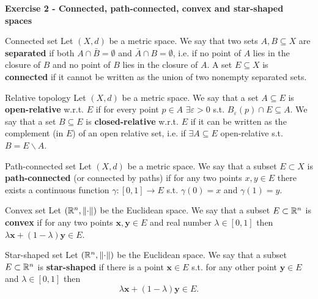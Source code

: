\documentclass[12pt,a4paper]{article}
\begin{document}
\noindent\textbf{Exercise 2 - Connected, path-connected, convex and star-shaped spaces}\\



\begin{Definition}{Connected set}{}
	Let $(X,d)$ be a metric space. We say that two sets $A,B\subseteq X$ are \textbf{separated} if both $A \cap \bar B = \emptyset$ and $\bar A \cap B = \emptyset$, i.e. if no point of $A$ lies in the closure of $B$ and no point of $B$ lies in the closure of $A$. A set $E\subseteq X$ is \textbf{connected} if it cannot be written as the union of two nonempty separated sets.
\end{Definition}

\begin{Definition}{Relative topology}{}
	Let $(X,d)$ be a metric space. We say that a set $A\subseteq E$ is \textbf{open-relative} w.r.t. $E$ if for every point $p\in A$ $\exists \varepsilon>0$ s.t. $B_\varepsilon(p)\cap E \subseteq A$. We say that a set $B\subseteq E$ is \textbf{closed-relative} w.r.t. $E$ if it can be written as the complement (in $E$) of an open relative set, i.e. if $\exists A\subseteq E$ open-relative s.t. $B=E\backslash A$. 
\end{Definition}


\begin{Definition}{Path-connected set}{}
	Let $(X,d)$ be a metric space. We say that a subset $E\subset X$ is \textbf{path-connected} (or connected by paths) if for any two points $x,y\in E$ there exists a continuous function $\gamma:[0,1]\to E$ s.t. $\gamma(0)=x$ and $\gamma(1)=y$.
\end{Definition}

\begin{Definition}{Convex set}{}
		Let $(\mathbb{R}^n,\lVert\cdot\rVert)$ be the Euclidean space. We say that a subset $E\subset \mathbb{R}^n$ is \textbf{convex} if for any two points $\textbf{x},\textbf{y}\in E$ and real number $\lambda\in[0,1]$ then $\lambda\textbf{x}+ (1-\lambda)\textbf{y}\in E$.
\end{Definition}

\begin{Definition}{Star-shaped set}{}
	Let $(\mathbb{R}^n,\lVert\cdot\rVert)$ be the Euclidean space.  We say that a subset $E\subset \mathbb{R}^n$ is \textbf{star-shaped} if there is a point $\textbf{x}\in E$ s.t. for any other point $\textbf{y}\in E$ and $\lambda\in[0,1]$ then \[\lambda\textbf{x}+ (1-\lambda)\textbf{y}\in E.\]
\end{Definition}
\end{document}
